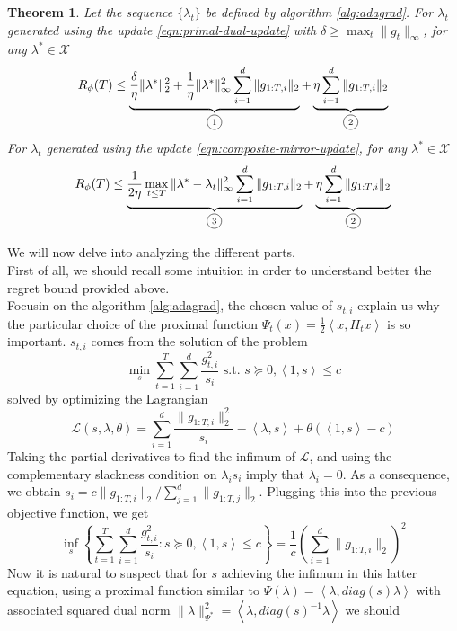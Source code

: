 \documentclass[notitlepage]{article}
\newcommand*\circled[1]{\tikz[baseline=(char.base)]{\node[shape=circle,draw,inner sep=2pt] (char) {#1};}}
\newtheorem{theorem}{Theorem}[section]
\begin{document}
\begin{theorem}
  Let the sequence $\{\lambda_t\}$ be defined by algorithm \ref{alg:adagrad}. For $\lambda_t$ generated using the update \eqref{eqn:primal-dual-update} with $\delta \ge \max_t \|g_t\|_\infty$, for any $\lambda^* \in \mathcal{X}$
  \begin{equation} 
    R_\phi(T) \le \underbrace{\frac{\delta}{\eta} \|\lambda^*\|_2^2 + \frac{1}{\eta} \|\lambda^*\|_\infty^2 \sum_{i=1}^d \|g_{1:T,i}\|_2}_{\text{\circled{1}}} + \underbrace{\eta \sum_{i=1}^d \|g_{1:T,i}\|_2}_{\text{\circled{2}}} 
    \label{eqn:pd-regret}
  \end{equation}
  For $\lambda_t$ generated using the update \eqref{eqn:composite-mirror-update}, for any $\lambda^* \in \mathcal{X}$
  \begin{equation}
    R_\phi(T) \le \underbrace{\frac{1}{2\eta} \max_{t \le T} \|\lambda^* - \lambda_t\|_\infty^2 \sum_{i=1}^d \|g_{1:T,i}\|_2}_{\text{\circled{3}}} + \underbrace{\eta \sum_{i=1}^d \|g_{1:T,i}\|_2}_{\text{\circled{2}}} 
    \label{eqn:cm-regret}  
  \end{equation}
  \label{th:regrets}
\end{theorem}
We will now delve into analyzing the different \circled{$\cdot$} parts.\\
First of all, we should recall some intuition in order to understand better the regret bound provided above.\\
Focusin on the algorithm \ref{alg:adagrad}, the chosen value of $s_{t,i}$ explain us why the particular choice of the proximal function $\Psi_t(x) = \frac{1}{2} \left\langle x,H_t x \right\rangle$ is so important. $s_{t,i}$ comes from the solution of the problem
\[ \min_s \sum_{t=1}^T \sum_{i=1}^d \frac{g_{t,i}^2}{s_i} \text{ s.t. } s \succeq 0, \left\langle 1,s \right\rangle \le c \] 
solved by optimizing the Lagrangian
\[ 
  \mathcal{L}(s,\lambda,\theta) = \sum_{i=1}^d \frac{\| g_{1:T,i} \|_2^2}{s_i} - \left\langle \lambda,s \right\rangle + \theta (\left\langle 1,s \right\rangle - c ) 
\]
Taking the partial derivatives to find the infimum of $\mathcal{L}$, and using the complementary slackness condition on $\lambda_i s_i$ imply that $\lambda_i = 0$. As a consequence, we obtain $s_i = c \| g_{1:T,i} \|_2 / \sum_{j=1}^d \| g_{1:T,j} \|_2$.
Plugging this into the previous objective function, we get
\[ \inf_s \left\lbrace \sum_{t=1}^T \sum_{i=1}^d \frac{g_{t,i}^2}{s_i} : s \succeq 0, \left\langle 1,s \right\rangle \le c \right\rbrace = \frac{1}{c} \left(\sum_{i=1}^d \| g_{1:T,i} \|_2 \right)^2  \]
Now it is natural to suspect that for $s$ achieving the infimum in this latter equation, using a proximal function similar to $\Psi(\lambda) = \left\langle \lambda,diag(s) \lambda \right\rangle$ with associated squared dual norm $\|\lambda\|_{\Psi^*}^2 = \left\langle \lambda,diag(s)^{-1}\lambda \right\rangle$ we should 
\end{document}
